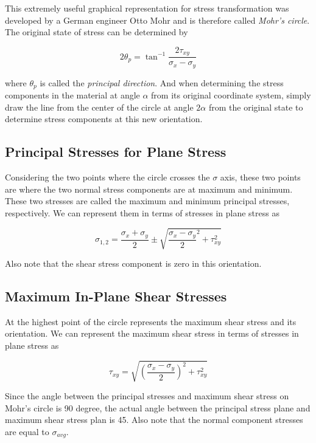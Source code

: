 \documentclass[
10pt,
a4paper,
openany,
svgnames,
]{kaobook} %
\begin{document}
This extremely useful graphical representation for stress transformation was developed by a German engineer Otto Mohr and is therefore called \emph{Mohr’s circle}.
The original state of stress can be determined by

\begin{equation} \label{eqn: principal direction}
  2\theta_p = \tan^{-1}\frac{2\tau_{xy}}{\sigma_x - \sigma_y}
\end{equation}

where $\theta _p$ is called the \emph{principal direction}. And when determining the stress components in the material at angle $\alpha$ from its original coordinate system, simply draw the line from the center of the circle at angle $2\alpha$ from the original state to determine stress components at this new orientation.

\subsection{Principal Stresses for Plane Stress}

Considering the two points where the circle crosses the $\sigma$ axis, these two points are where the two normal stress components are at maximum and minimum. These two stresses are called the maximum and minimum principal stresses, respectively. We can represent them in terms of stresses in plane stress as

\begin{equation} \label{eqn: principal stresses}
  \sigma_{1,2} = \frac{\sigma_x + \sigma_y}{2} \pm \sqrt {\frac{\sigma_x - \sigma_y}{2}^2 + \tau _{xy}^2}
\end{equation}

Also note that the shear stress component is zero in this orientation.

\subsection{Maximum In-Plane Shear Stresses}

At the highest point of the circle represents the maximum shear stress and its orientation. We can represent the maximum shear stress in terms of stresses in plane stress as

\begin{equation} \label{eqn: max shear stress}
  \tau_{xy} = \sqrt {\left( \frac{\sigma_x - \sigma_y}{2} \right)^2 + \tau_{xy}^2}
\end{equation}

Since the angle between the principal stresses and maximum shear stress on Mohr’s circle is 90 degree, the actual angle between the principal stress plane and maximum shear stress plan is 45. Also note that the normal component stresses are equal to $\sigma_{avg}$.
\end{document}

